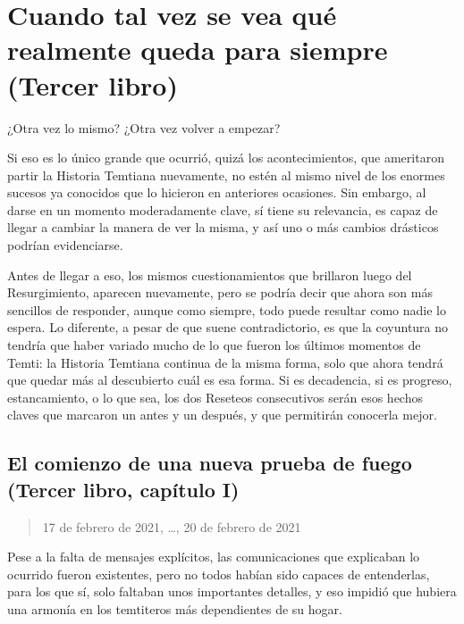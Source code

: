 \documentclass[
  spanish,
]{book}
\begin{document}
\hypertarget{cuando-tal-vez-se-vea-quuxe9-realmente-queda-para-siempre-tercer-libro}{%
\chapter{Cuando tal vez se vea qué realmente queda para siempre (Tercer libro)}\label{cuando-tal-vez-se-vea-quuxe9-realmente-queda-para-siempre-tercer-libro}}

¿Otra vez lo mismo? ¿Otra vez volver a empezar?

Si eso es lo único grande que ocurrió, quizá los acontecimientos, que ameritaron partir la Historia Temtiana nuevamente, no estén al mismo nivel de los enormes sucesos ya conocidos que lo hicieron en anteriores ocasiones. Sin embargo, al darse en un momento moderadamente clave, sí tiene su relevancia, es capaz de llegar a cambiar la manera de ver la misma, y así uno o más cambios drásticos podrían evidenciarse.

Antes de llegar a eso, los mismos cuestionamientos que brillaron luego del Resurgimiento, aparecen nuevamente, pero se podría decir que ahora son más sencillos de responder, aunque como siempre, todo puede resultar como nadie lo espera. Lo diferente, a pesar de que suene contradictorio, es que la coyuntura no tendría que haber variado mucho de lo que fueron los últimos momentos de Temti: la Historia Temtiana continua de la misma forma, solo que ahora tendrá que quedar más al descubierto cuál es esa forma. Si es decadencia, si es progreso, estancamiento, o lo que sea, los dos Reseteos consecutivos serán esos hechos claves que marcaron un antes y un después, y que permitirán conocerla mejor.

\hypertarget{el-comienzo-de-una-nueva-prueba-de-fuego-tercer-libro-capuxedtulo-i}{%
\section{El comienzo de una nueva prueba de fuego (Tercer libro, capítulo I)}\label{el-comienzo-de-una-nueva-prueba-de-fuego-tercer-libro-capuxedtulo-i}}

\begin{quote}
17 de febrero de 2021, \ldots, 20 de febrero de 2021
\end{quote}

Pese a la falta de mensajes explícitos, las comunicaciones que explicaban lo ocurrido fueron existentes, pero no todos habían sido capaces de entenderlas, para los que sí, solo faltaban unos importantes detalles, y eso impidió que hubiera una armonía en los temtiteros más dependientes de su hogar.
\end{document}
